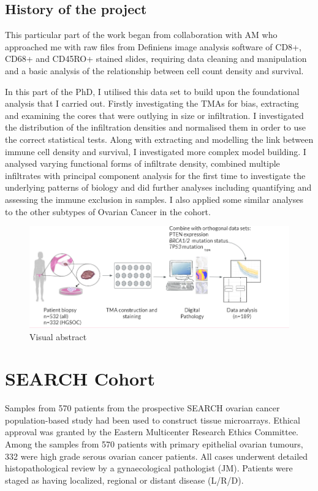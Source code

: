 \subsection{History of the project}
This particular part of the work began from collaboration with AM who approached me with raw files from Definiens image analysis software of CD8+, CD68+ and CD45RO+ stained slides, requiring data cleaning and manipulation and a basic analysis of the relationship between cell count density and survival. 

In this part of the PhD, I utilised this data set to build upon the foundational analysis that I carried out. Firstly investigating the TMAs for bias, extracting and examining the cores that were outlying in size or infiltration. I investigated the distribution of the infiltration densities and normalised them in order to use the correct statistical tests. Along with extracting and modelling the link between immune cell density and survival, I investigated more complex model building. I analysed varying functional forms of infiltrate density, combined multiple infiltrates with principal component analysis for the first time to investigate the underlying patterns of biology and did further analyses including quantifying and assessing the immune exclusion in samples. I also applied some similar analyses to the other subtypes of Ovarian Cancer in the cohort.

\begin{figure}
    \centering
    \includegraphics{Chapter2/Figs/Raster/Thesis_visual_abstract.PNG}
    \caption[Visual Abstract]{Visual abstract}
    \label{fig:visual_abstract}
\end{figure}

\section{SEARCH Cohort}

Samples from 570 patients from the prospective SEARCH ovarian cancer population-based study had been used to construct tissue microarrays. Ethical approval was granted by the Eastern Multicenter Research Ethics Committee. Among the samples from 570 patients with primary epithelial ovarian tumours, 332 were high grade serous ovarian cancer patients. All cases underwent detailed histopathological review by a gynaecological pathologist (JM). Patients were staged as having localized, regional or distant disease (L/R/D).

